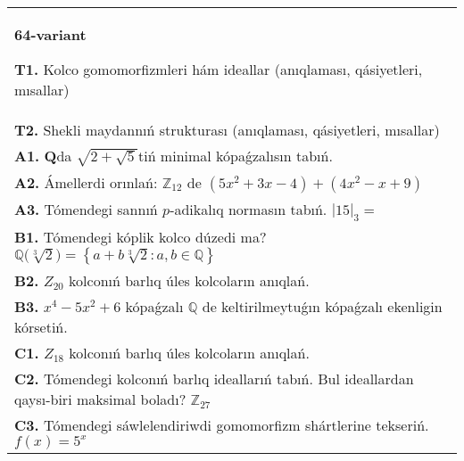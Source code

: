 \documentclass{article}
\begin{document}
\begin{tabular}{m{17cm}}
\textbf{64-variant}
\newline

\textbf{T1.} Kolco gomomorfizmleri hám ideallar (anıqlaması, qásiyetleri, mısallar) \\
\textbf{T2.} Shekli maydannıń strukturası (anıqlaması, qásiyetleri, mısallar) \\
\textbf{A1.} \(\mathbf{Q}\)da \(\sqrt{2 + \sqrt{5}}\)tiń minimal kópaǵzalısın tabıń. \\
\textbf{A2.} Ámellerdi orınlań: \(\mathbb{Z}_{12}\) de \(\left( 5x^{2} + 3x - 4 \right) + \left( 4x^{2} - x + 9 \right)\) \\
\textbf{A3.} Tómendegi sannıń \(p\)-adikalıq normasın tabıń. \(|15|_{3} =\) \\
\textbf{B1.} Tómendegi kóplik kolco dúzedi ma? \(\mathbb{Q(}\sqrt[3]{2}) = \left\{ a + b\sqrt[3]{2}:a,b \in \mathbb{Q} \right\}\) \\
\textbf{B2.} \(Z_{20}\) kolconıń barlıq úles kolcoların anıqlań. \\
\textbf{B3.} \(x^{4} - 5x^{2} + 6\) kópaǵzalı \(\mathbb{Q}\) de keltirilmeytuǵın kópaǵzalı ekenligin kórsetiń. \\
\textbf{C1.} \(Z_{18}\) kolconıń barlıq úles kolcoların anıqlań. \\
\textbf{C2.} Tómendegi kolconıń barlıq ideallarıń tabıń. Bul ideallardan qaysı-biri maksimal boladı? \(\mathbb{Z}_{27}\) \\
\textbf{C3.} Tómendegi sáwlelendiriwdi gomomorfizm shártlerine tekseriń. \(f(x) = 5^{x}\) \\

\end{tabular}
\vspace{1cm}
\end{document}
